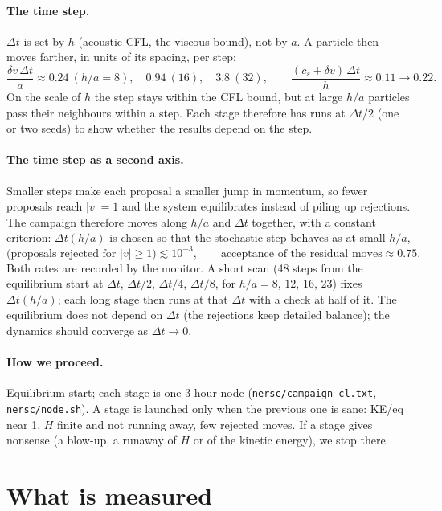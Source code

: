 \documentclass[11pt,aps,preprint,nofootinbib,superscriptaddress,tightenlines]{revtex4-2}
\def\st{\begin{equation}}
\def\stp{\end{equation}}
\let\oldparagraph\paragraph
\renewcommand{\paragraph}{\par\bigskip\oldparagraph}
\begin{document}
\paragraph{The time step.}  $\Delta t$ is set by $h$ (acoustic CFL, the viscous bound), not by
$a$.  A particle then moves farther, in units of its spacing, per step:
\st
\frac{\delta v\,\Delta t}{a}\approx0.24\ (h/a=8),\quad0.94\ (16),\quad3.8\ (32),
\qquad\frac{(c_s+\delta v)\,\Delta t}{h}\approx0.11\to0.22 .
\stp
On the scale of $h$ the step stays within the CFL bound, but at large $h/a$ particles pass
their neighbours within a step.  Each stage therefore has runs at $\Delta t/2$ (one or two
seeds) to show whether the results depend on the step.

\paragraph{The time step as a second axis.}  Smaller steps make each proposal a smaller jump
in momentum, so fewer proposals reach $|v|=1$ and the system equilibrates instead of piling
up rejections.  The campaign therefore moves along $h/a$ and $\Delta t$ together, with a
constant criterion: $\Delta t(h/a)$ is chosen so that the stochastic step behaves as at small
$h/a$,
\st
\text{(proposals rejected for }|v|\ge1)\lesssim10^{-3},\qquad
\text{acceptance of the residual moves}\approx0.75 .
\label{criterion}
\stp
Both rates are recorded by the monitor.  A short scan (48 steps from the equilibrium start at
$\Delta t$, $\Delta t/2$, $\Delta t/4$, $\Delta t/8$, for $h/a=8$, $12$, $16$, $23$) fixes $\Delta t(h/a)$; each
long stage then runs at that $\Delta t$ with a check at half of it.  The equilibrium does not
depend on $\Delta t$ (the rejections keep detailed balance); the dynamics should converge as
$\Delta t\to0$.

\paragraph{How we proceed.}  Equilibrium start; each stage is one 3-hour node
(\texttt{nersc/campaign\_cl.txt}, \texttt{nersc/node.sh}).  A stage is launched only when the
previous one is sane: KE/eq near 1, $H$ finite and not running away, few rejected moves.
If a stage gives nonsense (a blow-up, a runaway of $H$ or of the kinetic energy), we stop
there.

\section{What is measured}
\label{sec:outputs}
\end{document}
